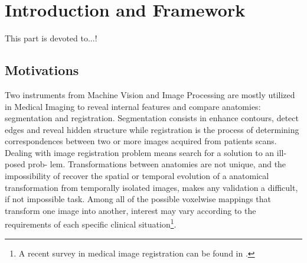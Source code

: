 \chapter{Introduction and Framework}\label{ch:introduction}


This part is devoted to...!


\section{Motivations}

Two instruments from Machine Vision and Image Processing are mostly utilized in Medical Imaging to reveal internal features and compare anatomies: segmentation and registration. Segmentation consists in enhance contours, detect edges and reveal hidden structure while registration is the process of determining correspondences between two or more images acquired from patients scans.\\
Dealing with image registration problem means search for a solution to an ill-posed prob- lem. Transformations between anatomies are not unique, and the impossibility of recover the spatial or temporal evolution of a anatomical transformation from temporally isolated images, makes any validation a difficult, if not impossible task. Among all of the possible voxelwise mappings that transform one image into another, interest may vary according to the requirements of each specific clinical situation\footnote{A recent survey in medical image registration can be found in \cite{Sotiras:survey:13}.}.\\
%
